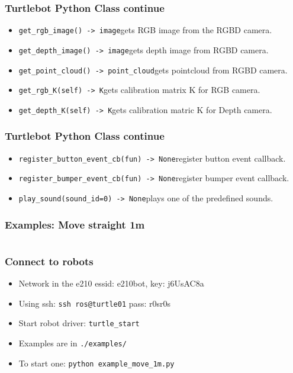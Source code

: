 \documentclass{beamer}
\begin{document}
\begin{frame}[fragile]
  \frametitle{Turtlebot Python Class continue}
  \begin{itemize}
  \item \verb|get_rgb_image() -> image|\break gets RGB image from the RGBD camera.
  \item \verb|get_depth_image() -> image|\break gets depth image from RGBD camera.
  \item \verb|get_point_cloud() -> point_cloud|\break gets pointcloud from RGBD camera.
  \item \verb|get_rgb_K(self) -> K|\break gets calibration matrix K for RGB camera.
  \item \verb|get_depth_K(self) -> K|\break gets calibration matric K for Depth camera.
  \end{itemize}
\end{frame}

\begin{frame}[fragile]
  \frametitle{Turtlebot Python Class continue}
  \begin{itemize}
  \item \verb|register_button_event_cb(fun) -> None|\break register button event callback.
  \item \verb|register_bumper_event_cb(fun) -> None|\break register bumper event callback.
  \item \verb|play_sound(sound_id=0) -> None|\break plays one of the predefined sounds.
  \end{itemize}
\end{frame}

\begin{frame}[fragile]
  \frametitle{Examples: Move straight 1m}
  \inputminted[linenos, numbersep=5pt, frame=lines]{python}{../scripts/example_move_1m.py}
\end{frame}

\begin{frame}[fragile]
  \frametitle{Connect to robots}
   \begin{itemize}
   \item Network in the e210 essid: e210bot, key: j6UsAC8a
   \item Using ssh: \verb|ssh ros@turtle01| pass: r0sr0s
   \item Start robot driver: \verb|turtle_start|
   \item Examples are in \verb|./examples/|
   \item To start one: \verb|python example_move_1m.py|
   \end{itemize}
\end{frame}
\end{document}
